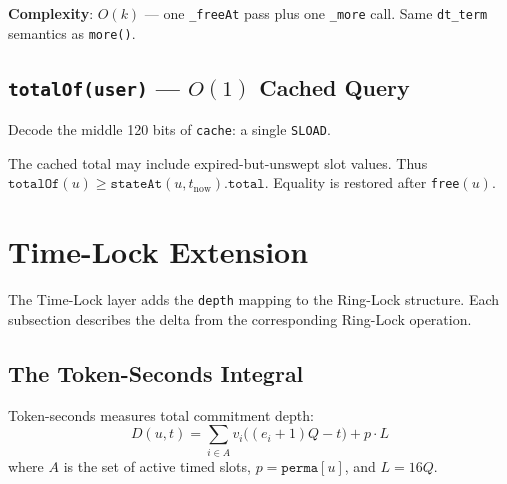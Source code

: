 \documentclass[10pt,a4paper,twocolumn]{article}
\begin{document}
\textbf{Complexity}: $O(k)$ --- one \texttt{\_freeAt} pass plus one \texttt{\_more} call. Same \texttt{dt\_term} semantics as \texttt{more()}.

\subsection{\texttt{totalOf(user)} --- $O(1)$ Cached Query}
\label{subsec:totalof}

Decode the middle 120 bits of \texttt{cache}: a single \texttt{SLOAD}.

\begin{remark}
\label{rem:totalof-inflation}
The cached total may include expired-but-unswept slot values. Thus $\texttt{totalOf}(u) \geq \texttt{stateAt}(u, t_{\text{now}}).\texttt{total}$. Equality is restored after \texttt{free}$(u)$.
\end{remark}

\FloatBarrier

\section{Time-Lock Extension}
\label{sec:timelock}

The Time-Lock layer adds the \texttt{depth} mapping to the Ring-Lock structure. Each subsection describes the delta from the corresponding Ring-Lock operation.

\subsection{The Token-Seconds Integral}
\label{subsec:integral}

Token-seconds measures total commitment depth:
\begin{equation}
\label{eq:depth-def}
D(u,t) = \sum_{i \in A} v_i \bigl((e_i{+}1)Q - t\bigr) + p \cdot L
\end{equation}
where $A$ is the set of active timed slots, $p = \texttt{perma}[u]$, and $L = 16Q$.
\end{document}
